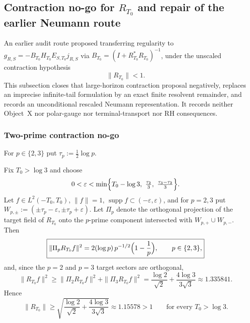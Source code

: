 
\subsection{Contraction no-go for \(R_{T_0}\) and repair of the earlier Neumann route}
\label{subsec:o3ag-contraction-nogo}

An earlier audit route proposed transferring regularity to
\(g_{R,S}=-B_{T_0}H_{T_0}E_{S,T_0}j_{R,S}\) via
\(B_{T_0}=(I+R_{T_0}^*R_{T_0})^{-1}\), under the unscaled contraction hypothesis
\[
 \|R_{T_0}\|<1.
\]
This subsection closes that large-horizon contraction proposal negatively, replaces an
imprecise infinite-tail formulation by an exact finite resolvent remainder, and records
an unconditional rescaled Neumann representation.  It records neither Object~X nor
polar-gauge nor terminal-transport nor RH consequences.

\subsubsection*{Two-prime contraction no-go}

For \(p\in\{2,3\}\) put \(\tau_p:=\tfrac12\log p\).

\begin{theorem}
\label{thm:o3ag-contraction-nogo}
Fix \(T_0>\log3\) and choose
\[
 0<\varepsilon<\min\Bigl\{T_0-\log3,\ \tfrac{\tau_2}{3},\ \tfrac{\tau_3-\tau_2}{3}\Bigr\}.
\]
Let \(f\in L^2(-T_0,T_0)\), \(\|f\|=1\), \(\operatorname{supp}f\subset(-\varepsilon,\varepsilon)\),
and for \(p=2,3\) put \(W_{p,\pm}:=(\pm\tau_p-\varepsilon,\pm\tau_p+\varepsilon)\).  Let
\(\Pi_p\) denote the orthogonal projection of the target field of \(R_{T_0}\) onto the
\(p\)-prime component intersected with \(W_{p,+}\cup W_{p,-}\).  Then
\[
 \boxed{
 \|\Pi_pR_{T_0}f\|^2=2(\log p)\,p^{-1/2}\Bigl(1-\frac1p\Bigr),\qquad p\in\{2,3\},
 }
\]
and, since the \(p=2\) and \(p=3\) target sectors are orthogonal,
\[
 \boxed{
 \|R_{T_0}f\|^2\ge\|\Pi_2R_{T_0}f\|^2+\|\Pi_3R_{T_0}f\|^2
 =\frac{\log2}{\sqrt2}+\frac{4\log3}{3\sqrt3}\approx1.335841.
 }
\]
Hence
\[
 \boxed{
 \|R_{T_0}\|\ge\sqrt{\frac{\log2}{\sqrt2}+\frac{4\log3}{3\sqrt3}}\approx1.15578>1
 \qquad\text{for every }T_0>\log3.
 }
\]
\end{theorem}

